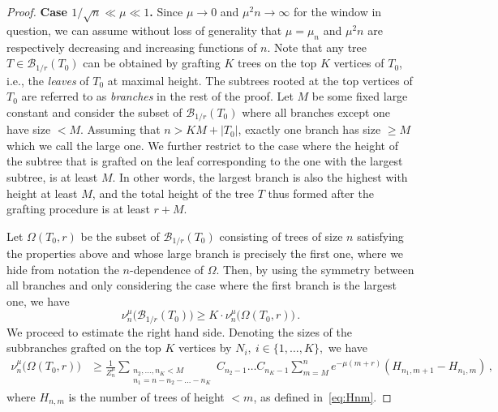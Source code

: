 \documentclass{article}
\newcommand{\1}{\mathbbm{1}}								%
\theoremstyle{definition}
\numberwithin{equation}{section}
\begin{document}
\begin{proof}

\noindent \textbf{Case $1/\sqrt{n}\ll \mu \ll 1$.} Since $\mu \to 0$ and $\mu^2 n \to \infty$ for the window in question, we can assume without loss of generality that $\mu=\mu_n$ and $\mu^2 n$ are respectively decreasing and increasing functions of $n$.
Note that any tree  $ T \in \mathcal{B}_{1/r} (T_0)$ can be obtained by grafting $K$ trees on the top $K$ vertices of $T_0$, i.e., the \emph{leaves} of $T_0$ at maximal height. The subtrees rooted at the top vertices of $T_0$ are referred to as \emph{branches} in the rest of the proof.
Let $M$ be some fixed large constant and consider the subset of $\mathcal{B}_{1/r} (T_0)$ where all branches except one have size $< M$. Assuming that $n > KM + |T_0|$, {exactly} one branch has size $\geq M$ which we call the large one. We further restrict to the case where the height of the subtree that is grafted on the leaf corresponding to the one with the largest subtree, is at least $M$. In other words, the largest branch is also the highest with height at least $M$, and the total height of the tree $T$ thus formed after the grafting procedure is at least $r+M$.
 
Let $\Omega(T_0, r)$ be the subset of $\mathcal{B}_{1/r} (T_0)$ consisting of trees of size $n$ satisfying the properties above and whose large branch is precisely the first one, where we hide from notation the $n$-dependence of $\Omega$. Then, {by using the symmetry between all branches and only considering the case where the first branch is the largest one, we have}
$$
\nu^\mu _n \big(\mathcal{B}_{1/r} (T_0)\big) \geq K \cdot \nu^\mu _n \big(\Omega(T_0,r)\big) \,.
$$
We proceed to estimate the right hand side. Denoting the sizes of the subbranches grafted on the top $K$ vertices by $N_i, ~i\in \{1, \dots , K\},$ we have
\begin{align*}
\nu^\mu _n \big(\Omega(T_0,r)\big) & \geq  \frac{1}{Z_n^\mu}   \sum \limits_{\substack{n_2,\dots, n_K <M\\ n_1 = n- n_2 - \dots - n_K}} C_{n_2-1} \dots C_{n_K-1} \sum_{m=M} ^n e^{-\mu (m+r)} (H_{n_1,m+1}-H_{n_1,m}) \, ,
\end{align*}
where $H_{n,m}$ is the number of trees of height $<m$, as defined in~\eqref{eq:Hnm}.



\end{proof}
\end{document}

